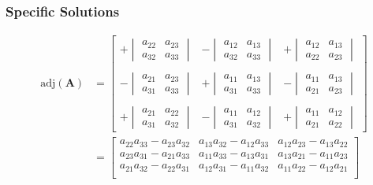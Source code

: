 \subsubsection{Specific Solutions}
\begin{small}
    \noindent\begin{align*}
        \mathrm{adj}(\mathbf{A}) & = \begin{bmatrix}
                                         +\begin{vmatrix}a_{22}&a_{23}\\a_{32}&a_{33}\end{vmatrix} & -\begin{vmatrix}a_{12}&a_{13}\\a_{32}&a_{33}\end{vmatrix} & +\begin{vmatrix}a_{12}&a_{13}\\a_{22}&a_{23}\end{vmatrix} \\\\
                                         -\begin{vmatrix}a_{21}&a_{23}\\a_{31}&a_{33}\end{vmatrix} & +\begin{vmatrix}a_{11}&a_{13}\\a_{31}&a_{33}\end{vmatrix} & -\begin{vmatrix}a_{11}&a_{13}\\a_{21}&a_{23}\end{vmatrix} \\\\
                                         +\begin{vmatrix}a_{21}&a_{22}\\a_{31}&a_{32}\end{vmatrix} & -\begin{vmatrix}a_{11}&a_{12}\\a_{31}&a_{32}\end{vmatrix} & +\begin{vmatrix}a_{11}&a_{12}\\a_{21}&a_{22}\end{vmatrix}
                                     \end{bmatrix} \\
                                 & = \begin{bmatrix}
                                         a_{22}a_{33}-a_{23}a_{32} & a_{13}a_{32}-a_{12}a_{33} & a_{12}a_{23}-a_{13}a_{22} \\
                                         a_{23}a_{31}-a_{21}a_{33} & a_{11}a_{33}-a_{13}a_{31} & a_{13}a_{21}-a_{11}a_{23} \\
                                         a_{21}a_{32}-a_{22}a_{31} & a_{12}a_{31}-a_{11}a_{32} & a_{11}a_{22}-a_{12}a_{21} \\
                                     \end{bmatrix}
    \end{align*}
\end{small}

